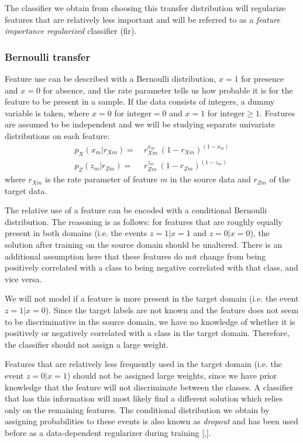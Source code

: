 \documentclass[twoside,11pt]{article}
\begin{document}
The classifier we obtain from choosing this transfer distribution will regularize features that are relatively less important and will be referred to as a \emph{feature importance regularized} classifier (fir).

\subsubsection{Bernoulli transfer}
Feature use can be described with a Bernoulli distribution, $x=1$ for presence and $x=0$ for absence, and the rate parameter tells us how probable it is for the feature to be present in a sample. If the data consists of integers, a dummy variable is taken, where $x=0$ for $\text{integer}=0$ and $x=1$ for $\text{integer}\geq 1$. Features are assumed to be independent and we will be studying separate univariate distributions on each feature:
\begin{align}
p_{X}(x_{m}|r_{Xm}) =& \ r_{Xm}^{x_m} \ (1-r_{Xm})^{(1-x_m)} \label{bernQ}\\
p_{Z}(z_{m}|r_{Zm}) =& \ r_{Zm}^{z_m} \ (1-r_{Zm})^{(1-z_m)} \label{bernP}
\end{align}
where $r_{Xm}$ is the rate parameter of feature $m$ in the source data and $r_{Zm}$ of the target data. 

The relative use of a feature can be encoded with a conditional Bernoulli distribution. The reasoning is as follows: for features that are roughly equally present in both domains (i.e. the events $z=1 | x=1$ and $z=0 | x=0$), the solution after training on the source domain should be unaltered. There is an additional assumption here that these features do not change from being positively correlated with a class to being negative correlated with that class, and vice versa. 

We will not model if a feature is more present in the target domain (i.e. the event $z=1 | x=0$). Since the target labels are not known and the feature does not seem to be discriminative in the source domain, we have no knowledge of whether it is positively or negatively correlated with a class in the target domain. Therefore, the classifier should not assign a large weight.

Features that are relatively less frequently used in the target domain (i.e. the event $z=0 | x=1$) should not be assigned large weights, since we have prior knowledge that the feature will not discriminate between the classes. A classifier that has this information will most likely find a different solution which relies only on the remaining features. The conditional distribution we obtain by assigning probabilities to these events is also known as \emph{dropout} and has been used before as a data-dependent regularizer during training [\cite{wager2013dropout},\cite{rostamizadeh2011learning}]. 
\end{document}
